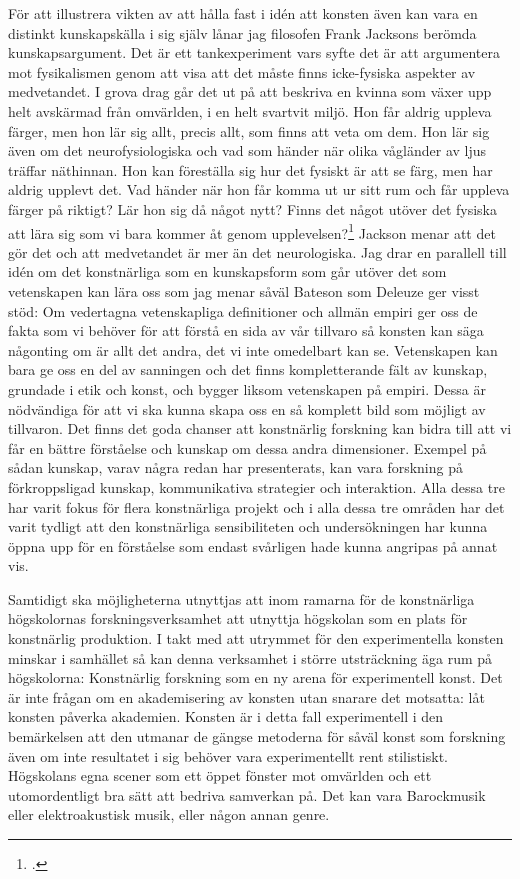 \documentclass[11pt]{article}
\begin{document}
För att illustrera vikten av att hålla fast i idén att konsten även
kan vara en distinkt kunskapskälla i sig själv lånar jag filosofen
Frank Jacksons berömda kunskapsargument. Det är ett tankexperiment
vars syfte det är att argumentera mot fysikalismen genom att visa att
det måste finns icke-fysiska aspekter av medvetandet. I grova drag går
det ut på att beskriva en kvinna som växer upp helt avskärmad från
omvärlden, i en helt svartvit miljö. Hon får aldrig uppleva färger,
men hon lär sig allt, precis allt, som finns att veta om dem. Hon lär
sig även om det neurofysiologiska och vad som händer när olika
vågländer av ljus träffar näthinnan. Hon kan föreställa sig hur det
fysiskt är att se färg, men har aldrig upplevt det. Vad händer när hon
får komma ut ur sitt rum och får uppleva färger på riktigt?  Lär hon
sig då något nytt? Finns det något utöver det fysiska att lära sig som
vi bara kommer åt genom upplevelsen?\footcite[sid. 130]{Jackson1982}
Jackson menar att det gör det och att medvetandet är mer än det
neurologiska. Jag drar en parallell till idén om det konstnärliga som
en kunskapsform som går utöver det som vetenskapen kan lära oss som
jag menar såväl Bateson som Deleuze ger visst stöd: Om vedertagna
vetenskapliga definitioner och allmän empiri ger oss de fakta som vi
behöver för att förstå en sida av vår tillvaro så konsten kan säga
någonting om är allt det andra, det vi inte omedelbart kan
se. Vetenskapen kan bara ge oss en del av sanningen och det finns
kompletterande fält av kunskap, grundade i etik och konst, och bygger
liksom vetenskapen på empiri. Dessa är nödvändiga för att vi ska kunna
skapa oss en så komplett bild som möjligt av tillvaron. Det finns det
goda chanser att konstnärlig forskning kan bidra till att vi får en
bättre förståelse och kunskap om dessa andra dimensioner. Exempel på
sådan kunskap, varav några redan har presenterats, kan vara forskning
på förkroppsligad kunskap, kommunikativa strategier och
interaktion. Alla dessa tre har varit fokus för flera konstnärliga
projekt och i alla dessa tre områden har det varit tydligt att den
konstnärliga sensibiliteten och undersökningen har kunna öppna upp för
en förståelse som endast svårligen hade kunna angripas på annat vis.

Samtidigt ska möjligheterna utnyttjas att inom ramarna för de
konstnärliga högskolornas forskningsverksamhet att utnyttja högskolan
som en plats för konstnärlig produktion. I takt med att utrymmet för
den experimentella konsten minskar i samhället så kan denna verksamhet
i större utsträckning äga rum på högskolorna: Konstnärlig forskning
som en ny arena för experimentell konst. Det är inte frågan om en
akademisering av konsten utan snarare det motsatta: låt konsten
påverka akademien. Konsten är i detta fall experimentell i den
bemärkelsen att den utmanar de gängse metoderna för såväl konst som
forskning även om inte resultatet i sig behöver vara experimentellt
rent stilistiskt. Högskolans egna scener som ett öppet fönster mot
omvärlden och ett utomordentligt bra sätt att bedriva samverkan på.
Det kan vara Barockmusik eller elektroakustisk musik, eller någon
annan genre.
\end{document}
